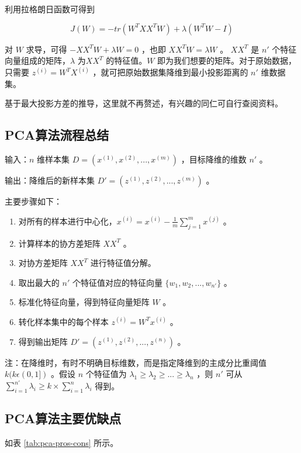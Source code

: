 利用拉格朗日函数可得到

$$
J(W) = -tr(W^TXX^TW) + \lambda(W^TW - I)
$$

对 $W$ 求导，可得 $-XX^TW + \lambda W = 0 $ ，也即 $ XX^TW = \lambda W $ 。 $ XX^T $ 是 $ n' $ 个特征向量组成的矩阵，$\lambda$ 为$ XX^T $ 的特征值。$W$ 即为我们想要的矩阵。对于原始数据，只需要 $z^{(i)} = W^TX^{(i)}$ ，就可把原始数据集降维到最小投影距离的 $n'$ 维数据集。

基于最大投影方差的推导，这里就不再赘述，有兴趣的同仁可自行查阅资料。

\subsection{PCA算法流程总结}

输入：$n$ 维样本集 $D = \left( x^{(1)},x^{(2)},...,x^{(m)} \right)$ ，目标降维的维数 $n'$ 。

输出：降维后的新样本集 $D'  = \left( z^{(1)},z^{(2)},...,z^{(m)} \right)$ 。

主要步骤如下：

\begin{enumerate}
	\itemsep0em
	\item 对所有的样本进行中心化，$ x^{(i)} = x^{(i)} - \frac{1}{m} \sum^m_{j=1} x^{(j)} $ 。
	\item 计算样本的协方差矩阵 $XX^T$ 。
	\item 对协方差矩阵 $XX^T$ 进行特征值分解。
	\item 取出最大的 $n'$ 个特征值对应的特征向量 $\{ w_1,w_2,...,w_{n'} \}$ 。
	\item 标准化特征向量，得到特征向量矩阵 $W$ 。
	\item 转化样本集中的每个样本 $z^{(i)} = W^T x^{(i)}$ 。
	\item 得到输出矩阵 $D' = \left( z^{(1)},z^{(2)},...,z^{(n)} \right)$ 。
\end{enumerate}

注：在降维时，有时不明确目标维数，而是指定降维到的主成分比重阈值 $k(k \epsilon(0,1])$ 。假设 $n$ 个特征值为 $\lambda_1 \geqslant \lambda_2 \geqslant ... \geqslant \lambda_n$ ，则 $n'$ 可从 $\sum^{n'}_{i=1} \lambda_i \geqslant k \times \sum^n_{i=1} \lambda_i $ 得到。

\subsection{PCA算法主要优缺点}

如表 \ref{tab:pca-pros-cons} 所示。

